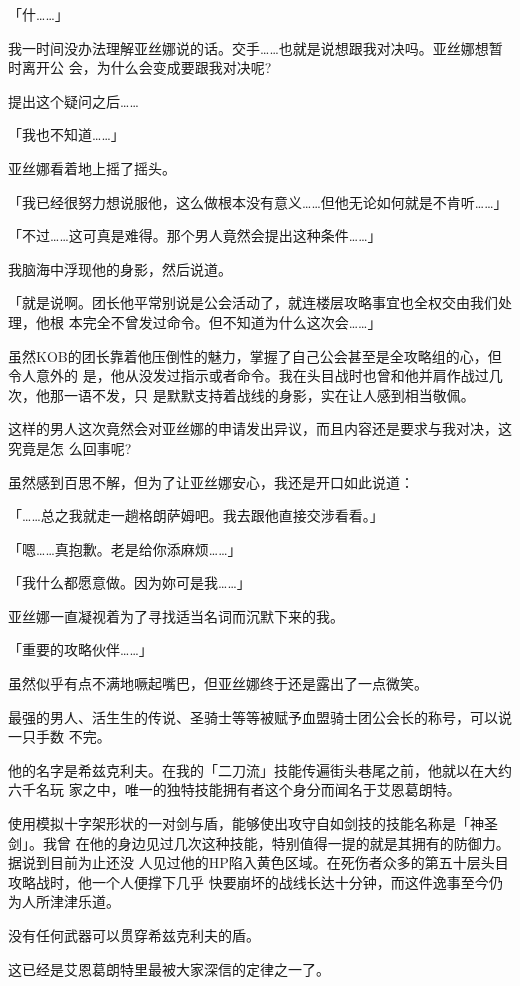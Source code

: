 \documentclass[11pt]{book}
\begin{document}
「什……」

我一时间没办法理解亚丝娜说的话。交手……也就是说想跟我对决吗。亚丝娜想暂时离开公
会，为什么会变成要跟我对决呢?

提出这个疑问之后……

「我也不知道……」

亚丝娜看着地上摇了摇头。

「我已经很努力想说服他，这么做根本没有意义……但他无论如何就是不肯听……」

「不过……这可真是难得。那个男人竟然会提出这种条件……」

我脑海中浮现他的身影，然后说道。

「就是说啊。团长他平常别说是公会活动了，就连楼层攻略事宜也全权交由我们处理，他根
本完全不曾发过命令。但不知道为什么这次会……」

虽然KOB的团长靠着他压倒性的魅力，掌握了自己公会甚至是全攻略组的心，但令人意外的
是，他从没发过指示或者命令。我在头目战时也曾和他并肩作战过几次，他那一语不发，只
是默默支持着战线的身影，实在让人感到相当敬佩。

这样的男人这次竟然会对亚丝娜的申请发出异议，而且内容还是要求与我对决，这究竟是怎
么回事呢?

虽然感到百思不解，但为了让亚丝娜安心，我还是开口如此说道：

「……总之我就走一趟格朗萨姆吧。我去跟他直接交涉看看。」

「嗯……真抱歉。老是给你添麻烦……」

「我什么都愿意做。因为妳可是我……」

亚丝娜一直凝视着为了寻找适当名词而沉默下来的我。

「重要的攻略伙伴……」

虽然似乎有点不满地噘起嘴巴，但亚丝娜终于还是露出了一点微笑。

最强的男人、活生生的传说、圣骑士等等被赋予血盟骑士团公会长的称号，可以说一只手数
不完。

他的名字是希兹克利夫。在我的「二刀流」技能传遍街头巷尾之前，他就以在大约六千名玩
家之中，唯一的独特技能拥有者这个身分而闻名于艾恩葛朗特。

使用模拟十字架形状的一对剑与盾，能够使出攻守自如剑技的技能名称是「神圣剑」。我曾
在他的身边见过几次这种技能，特别值得一提的就是其拥有的防御力。据说到目前为止还没
人见过他的HP陷入黄色区域。在死伤者众多的第五十层头目攻略战时，他一个人便撑下几乎
快要崩坏的战线长达十分钟，而这件逸事至今仍为人所津津乐道。

没有任何武器可以贯穿希兹克利夫的盾。

这已经是艾恩葛朗特里最被大家深信的定律之一了。
\end{document}
